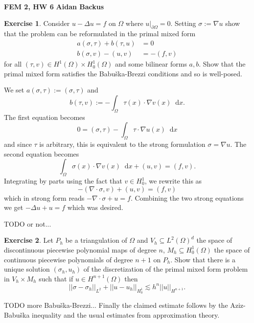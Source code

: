 \documentclass[10pt]{article}
\newcommand*\dif{\mathop{}\!\mathrm{d}}
\theoremstyle{definition}
\newtheorem{exer}{Exercise}
\begin{document}
\noindent
\large\textbf{FEM 2, HW 6} \hfill \textbf{Aidan Backus} \\

\begin{exer}
    Consider $u - \Delta u = f$ on $\Omega$ where $u|_{\partial \Omega} = 0$.
    Setting $\sigma := \nabla u$ show that the problem can be reformulated in the primal mixed form 
    \begin{align*}
        a(\sigma, \tau) + b(\tau, u) &= 0\\
        b(\sigma, v) - (u, v) &= -(f, v)
    \end{align*}
    for all $(\tau, v) \in H^1(\Omega) \times H^1_0(\Omega)$ and some bilinear forms $a, b$.
    Show that the primal mixed form satisfies the Babuška-Brezzi conditions and so is well-posed.
\end{exer}

We set $a(\sigma, \tau) := (\sigma, \tau)$ and
$$b(\tau, v) := -\int_\Omega \tau(x) \cdot \nabla v(x) \dif x.$$
The first equation becomes
$$0 = (\sigma, \tau) - \int_\Omega \tau \cdot \nabla u(x) \dif x$$
and since $\tau$ is arbitrary, this is equivalent to the strong formulation $\sigma = \nabla u$.
The second equation becomes 
$$\int_\Omega \sigma(x) \cdot \nabla v(x) \dif x + (u, v) = (f, v).$$
Integrating by parts using the fact that $v \in H^1_0$, we rewrite this as 
$$-(\nabla \cdot \sigma, v) + (u, v) = (f, v)$$
which in strong form reads $-\nabla \cdot \sigma + u = f$.
Combining the two strong equations we get $-\Delta u + u = f$ which was desired.

TODO or not...

\begin{exer}
    Let $P_h$ be a triangulation of $\Omega$ and $V_h \subseteq L^2(\Omega)^d$ the space of discontinuous piecewise polynomial maps of degree $n$, $M_h \subseteq H^1_0(\Omega)$ the space of continuous piecewise polynomials of degree $n + 1$ on $P_h$.
    Show that there is a unique solution $(\sigma_h, u_h)$ of the discretization of the primal mixed form problem in $V_h \times M_h$ such that if $u \in H^{n + 1}(\Omega)$ then 
    $$||\sigma - \sigma_h||_{L^2} + ||u - u_h||_{H^1_0} \lesssim h^n ||u||_{H^{n + 1}}.$$
\end{exer}

TODO more Babuška-Brezzi...
Finally the claimed estimate follows by the Aziz-Babuška inequality and the usual estimates from approximation theory.
\end{document}
